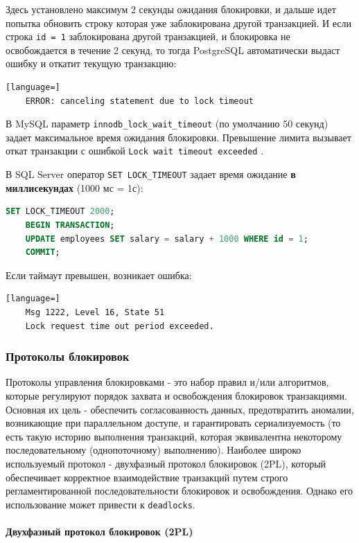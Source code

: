 Здесь установлено максимум 2 секунды ожидания блокировки, и дальше идет попытка обновить строку которая уже заблокирована другой транзакцией. И если строка \texttt{id = 1} заблокирована другой транзакцией, и блокировка не освобождается в течение 2 секунд, то тогда PostgreSQL автоматически выдаст ошибку и откатит текущую транзакцию:

\begin{lstlisting}[language=]
    ERROR: canceling statement due to lock timeout
\end{lstlisting}

В MySQL параметр \texttt{innodb\_lock\_wait\_timeout} (по умолчанию 50 секунд) задает максимальное время ожидания блокировки. Превышение лимита вызывает откат транзакции с ошибкой \texttt{Lock wait timeout exceeded} \autocite[§17.14]{Mysqldoc4}.

В SQL Server оператор \texttt{SET LOCK\_TIMEOUT} \autocite{MicrosoftLearnSQLserverSetLockTout} задает время ожидание \textbf{в миллисекундах} (1000 мс = 1с):
\begin{lstlisting}[language=SQL]
    SET LOCK_TIMEOUT 2000;
    BEGIN TRANSACTION;
    UPDATE employees SET salary = salary + 1000 WHERE id = 1;
    COMMIT;
\end{lstlisting}

Если таймаут превышен, возникает ошибка:
\begin{lstlisting}[language=]
    Msg 1222, Level 16, State 51
    Lock request time out period exceeded.    
\end{lstlisting}


\subsubsection{Протоколы блокировок}

Протоколы управления блокировками - это набор правил и/или алгоритмов, которые регулируют порядок захвата и освобождения блокировок транзакциями. Основная их цель - обеспечить согласованность данных, предотвратить аномалии, возникающие при параллельном доступе, и гарантировать сериализуемость (то есть такую историю выполнения транзакций, которая эквивалентна некоторому последовательному (однопоточному) выполнению).
Наиболее широко используемый протокол - двухфазный протокол блокировок (2PL), который обеспечивает корректное взаимодействие транзакций путем строго регламентированной последовательности блокировок и освобождения. Однако его использование может привести к \texttt{deadlocks}.


\paragraph{Двухфазный протокол блокировок (2PL)} ~\\

